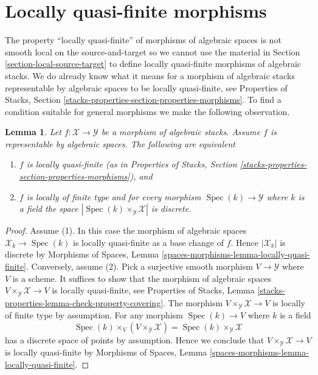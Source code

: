 \documentclass{stacks-project}
\theoremstyle{plain}
\newtheorem{lemma}[subsection]{Lemma}
\theoremstyle{definition}
\theoremstyle{remark}
\numberwithin{equation}{subsection}
\def\Spec{\mathop{\mathrm{Spec}}}
\begin{document}
\section{Locally quasi-finite morphisms}
\label{section-locally-quasi-finite}

\noindent
The property ``locally quasi-finite'' of morphisms of algebraic spaces
is not smooth local on the source-and-target so we cannot use the material in
Section \ref{section-local-source-target}
to define locally quasi-finite morphisms of algebraic stacks.
We do already know what it means for a morphism of algebraic stacks
representable by algebraic spaces to be locally quasi-finite, see
Properties of Stacks, Section
\ref{stacks-properties-section-properties-morphisms}.
To find a condition suitable for general morphisms we make the following
observation.

\begin{lemma}
\label{lemma-representable-by-spaces-quasi-finite}
Let $f : \mathcal{X} \to \mathcal{Y}$ be a morphism of algebraic stacks.
Assume $f$ is representable by algebraic spaces.
The following are equivalent
\begin{enumerate}
\item $f$ is locally quasi-finite (as in Properties of Stacks,
Section \ref{stacks-properties-section-properties-morphisms}), and
\item $f$ is locally of finite type and for every morphism
$\Spec(k) \to \mathcal{Y}$ where $k$ is a field the
space $|\Spec(k) \times_\mathcal{Y} \mathcal{X}|$ is discrete.
\end{enumerate}
\end{lemma}

\begin{proof}
Assume (1). In this case the morphism of algebraic spaces
$\mathcal{X}_k \to \Spec(k)$ is locally quasi-finite as a base change
of $f$. Hence $|\mathcal{X}_k|$ is discrete by
Morphisms of Spaces, Lemma \ref{spaces-morphisms-lemma-locally-quasi-finite}.
Conversely, assume (2). Pick a surjective smooth morphism
$V \to \mathcal{Y}$ where $V$ is a scheme. It suffices to show that the
morphism of algebraic spaces $V \times_\mathcal{Y} \mathcal{X} \to V$
is locally quasi-finite, see
Properties of Stacks, Lemma
\ref{stacks-properties-lemma-check-property-covering}.
The morphism $V \times_\mathcal{Y} \mathcal{X} \to V$ is locally of finite
type by assumption. For any morphism $\Spec(k) \to V$ where $k$ is a
field
$$
\Spec(k) \times_V (V \times_\mathcal{Y} \mathcal{X}) =
\Spec(k) \times_\mathcal{Y} \mathcal{X}
$$
has a discrete space of points by assumption. Hence we conclude that
$V \times_\mathcal{Y} \mathcal{X} \to V$ is locally quasi-finite by
Morphisms of Spaces, Lemma \ref{spaces-morphisms-lemma-locally-quasi-finite}.
\end{proof}
\end{document}
